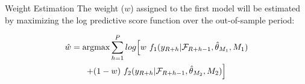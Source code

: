 \begin{frame}{Weight Estimation}
    The weight ($w$) assigned to the first model will be estimated by maximizing the log predictive score function over the out-of-sample period:

\begin{multline}
\hat{w} = \text{argmax} \sum^P_{h=1}log\Big[w \ f_1(y_{\small{R+h}}|\mathcal{F}_{\small{R+h-1}}, \hat\theta_{M_1}, M_1) \\
 + (1-w) \ f_2(y_{\small{R+h}}|\mathcal{F}_{\small{R+h-1}}, \hat\theta_{M_2}, M_2)\Big]
\end{multline}

\end{frame}


